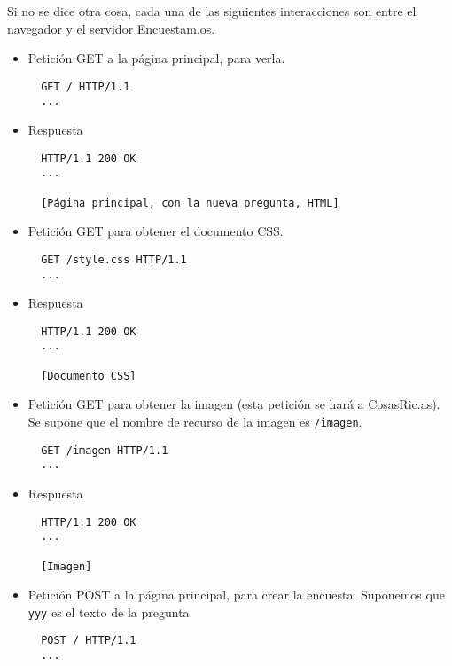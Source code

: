 Si no se dice otra cosa, cada una de las siguientes interacciones son entre el navegador y el servidor Encuestam.os.

\begin{itemize}

\item Petición GET a la página principal, para verla.

\begin{verbatim}
  GET / HTTP/1.1
  ...
\end{verbatim}

\item Respuesta

\begin{verbatim}
  HTTP/1.1 200 OK
  ...

  [Página principal, con la nueva pregunta, HTML]
\end{verbatim}

\item Petición GET para obtener el documento CSS.

\begin{verbatim}
  GET /style.css HTTP/1.1
  ...
\end{verbatim}

\item Respuesta

\begin{verbatim}
  HTTP/1.1 200 OK
  ...

  [Documento CSS]
\end{verbatim}

\item Petición GET para obtener la imagen (esta petición se hará a CosasRic.as). Se supone que el nombre de recurso de la imagen es \texttt{/imagen}.

\begin{verbatim}
  GET /imagen HTTP/1.1
  ...
\end{verbatim}

\item Respuesta

\begin{verbatim}
  HTTP/1.1 200 OK
  ...

  [Imagen]
\end{verbatim}

  
\item Petición POST a la página principal, para crear la encuesta. Suponemos que \texttt{yyy} es el texto de la pregunta. 

\begin{verbatim}
  POST / HTTP/1.1
  ...


\end{verbatim}
\end{itemize}
